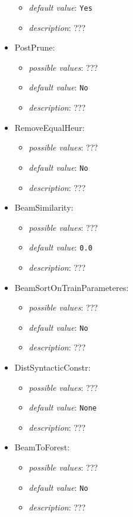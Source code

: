 \documentclass{article}
\begin{document}
\begin{itemize}
\begin{itemize}
                \item \emph{default value}: \texttt{Yes}
                \item \emph{description}: ???
           \end{itemize}
    \item PostPrune:
           \begin{itemize}
                \item \emph{possible values}: ???
                \item \emph{default value}: \texttt{No}
                \item \emph{description}: ???
           \end{itemize}
    \item RemoveEqualHeur:
           \begin{itemize}
                \item \emph{possible values}: ???
                \item \emph{default value}: \texttt{No}
                \item \emph{description}: ???
           \end{itemize}
    \item BeamSimilarity:
           \begin{itemize}
                \item \emph{possible values}: ???
                \item \emph{default value}: \texttt{0.0}
                \item \emph{description}: ???
           \end{itemize}
    \item BeamSortOnTrainParameteres:
           \begin{itemize}
                \item \emph{possible values}: ???
                \item \emph{default value}: \texttt{No}
                \item \emph{description}: ???
           \end{itemize}
    \item DistSyntacticConstr:
           \begin{itemize}
                \item \emph{possible values}: ???
                \item \emph{default value}: \texttt{None}
                \item \emph{description}: ???
           \end{itemize}
    \item BeamToForest:
           \begin{itemize}
                \item \emph{possible values}: ???
                \item \emph{default value}: \texttt{No}
                \item \emph{description}: ???
           \end{itemize}
\end{itemize}
\end{document}
